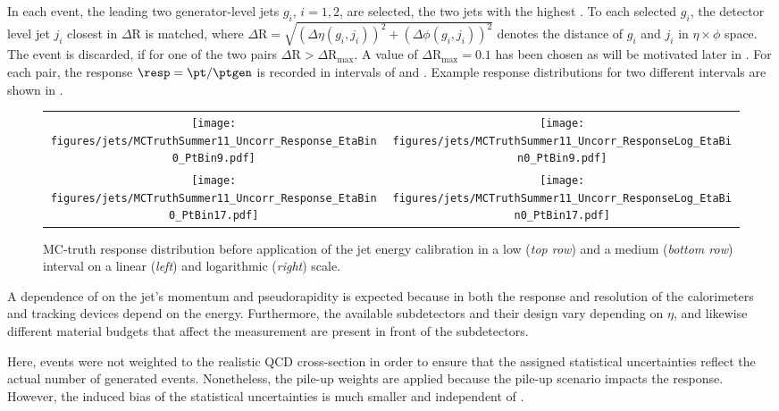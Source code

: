 In each event, the leading two generator-level jets $g_{i}$, \mbox{$i=1,2$}, are selected, \ie the two jets with the highest \ptgen.
To each selected $g_{i}$, the detector level jet $j_{i}$ closest in $\Delta \text{R}$ is matched, where \mbox{$\Delta\text{R} = \sqrt{(\Delta\eta(g_{i},j_{i}))^{2} + (\Delta\phi(g_{i},j_{i}))^{2}}$} denotes the distance of $g_{i}$ and $j_{i}$ in \mbox{$\eta\times\phi$} space.
The event is discarded, if for one of the two pairs \mbox{$\Delta\text{R} > \Delta\text{R}_{\text{max}}$}.
A value of \mbox{$\Delta\text{R}_{\text{max}} = 0.1$} has been chosen as will be motivated later in .
For each pair, the response \mbox{$\resp = \pt/\ptgen$} is recorded in intervals of \ptgen and \etagen.
Example response distributions for two different \ptgen intervals are shown in .
\begin{figure}[!ht]
  \centering
  \begin{tabular}{cc}
    \texttt{[image: figures/jets/MCTruthSummer11\_Uncorr\_Response\_EtaBin0\_PtBin9.pdf]} &
    \texttt{[image: figures/jets/MCTruthSummer11\_Uncorr\_ResponseLog\_EtaBin0\_PtBin9.pdf]} \\
    \texttt{[image: figures/jets/MCTruthSummer11\_Uncorr\_Response\_EtaBin0\_PtBin17.pdf]} &
    \texttt{[image: figures/jets/MCTruthSummer11\_Uncorr\_ResponseLog\_EtaBin0\_PtBin17.pdf]} \\
  \end{tabular}
  \caption{MC-truth response distribution before application of the jet energy calibration in a low (\textit{top row}) and a medium (\textit{bottom row}) \ptgen interval on a linear (\textit{left}) and logarithmic (\textit{right}) scale.}
  \label{fig:Jets:Response:UncorrectedResponseDistribution}
\end{figure}

A dependence of \resp on the jet's momentum and pseudorapidity is expected because in both the response and resolution of the calorimeters and tracking devices depend on the energy.
Furthermore, the available subdetectors and their design vary depending on $\eta$, and likewise different material budgets that affect the measurement are present in front of the subdetectors.

Here, events were not weighted to the realistic QCD cross-section in order to ensure that the assigned statistical uncertainties reflect the actual number of generated events.
Nonetheless, the pile-up weights are applied because the pile-up scenario impacts the response.
However, the induced bias of the statistical uncertainties is much smaller and independent of \pt.



